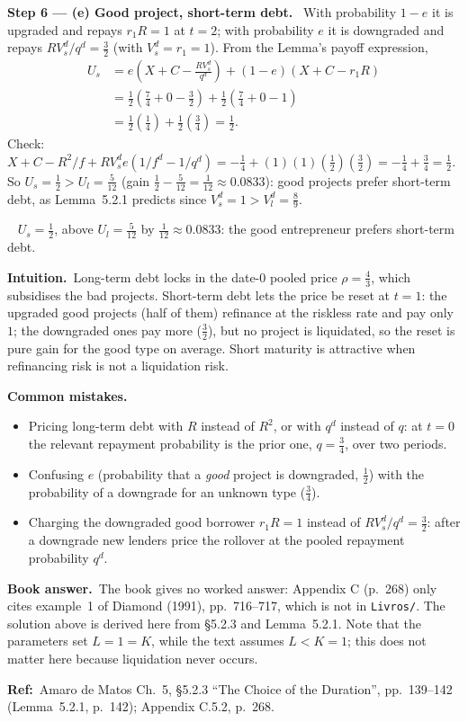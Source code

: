 \documentclass[11pt,a4paper]{article}
\newcommand{\step}[2]{\par\medskip\noindent\textbf{Step #1 --- #2.}~}
\newcommand{\intuition}{\par\medskip\noindent\textbf{Intuition.}~}
\newcommand{\bookans}{\par\medskip\noindent\textbf{Book answer.}~}
\newcommand{\refbib}{\par\smallskip\noindent\textbf{Ref:}~}
\newcommand{\answer}[1]{\par\smallskip\noindent\fbox{\textbf{Answer #1.}}~}
\newcommand{\pitfalls}{\par\medskip\noindent\textbf{Common mistakes.}}
\begin{document}
\step{6}{(e) Good project, short-term debt} With probability $1-e$ it is upgraded and repays $r_1R=1$
at $t=2$; with probability $e$ it is downgraded and repays $RV_s^d/q^d=\tfrac32$ (with $V_s^d=r_1=1$).
From the Lemma's payoff expression,
\begin{align}
  U_s &= e\left(X+C-\frac{RV_s^d}{q^d}\right)+(1-e)(X+C-r_1R) \label{t5e5-Us}\\
      &= \tfrac12\left(\tfrac74+0-\tfrac32\right)+\tfrac12\left(\tfrac74+0-1\right) \nonumber\\
      &= \tfrac12\left(\tfrac14\right)+\tfrac12\left(\tfrac34\right) = \tfrac12. \nonumber
\end{align}
Check: $X+C-R^2/f+RV_s^de(1/f^d-1/q^d)=-\tfrac14+(1)(1)\left(\tfrac12\right)\left(\tfrac32\right)=-\tfrac14+\tfrac34=\tfrac12$.
So $U_s=\tfrac12>U_l=\tfrac{5}{12}$ (gain $\tfrac12-\tfrac5{12}=\tfrac1{12}\approx0.0833$): good projects prefer
short-term debt, as Lemma~5.2.1 predicts since $V_s^d=1>V_l^d=\tfrac89$.

\answer{(e)} $U_s=\tfrac12$, above $U_l=\tfrac5{12}$ by $\tfrac1{12}\approx0.0833$: the good entrepreneur
prefers short-term debt.

\intuition Long-term debt locks in the date-0 pooled price $\rho=\tfrac43$, which subsidises the
bad projects. Short-term debt lets the price be reset at $t=1$: the upgraded good projects (half
of them) refinance at the riskless rate and pay only $1$; the downgraded ones pay more ($\tfrac32$),
but no project is liquidated, so the reset is pure gain for the good type on average. Short maturity
is attractive when refinancing risk is not a liquidation risk.
\pitfalls
\begin{itemize}
  \item Pricing long-term debt with $R$ instead of $R^2$, or with $q^d$ instead of $q$: at $t=0$ the
        relevant repayment probability is the prior one, $q=\tfrac34$, over two periods.
  \item Confusing $e$ (probability that a \emph{good} project is downgraded, $\tfrac12$) with the
        probability of a downgrade for an unknown type ($\tfrac34$).
  \item Charging the downgraded good borrower $r_1R=1$ instead of $RV_s^d/q^d=\tfrac32$: after a downgrade
        new lenders price the rollover at the pooled repayment probability $q^d$.
\end{itemize}
\bookans The book gives no worked answer: Appendix C (p.~268) only cites example~1 of Diamond (1991),
pp.~716--717, which is not in \texttt{Livros/}. The solution above is derived here from \S 5.2.3 and
Lemma~5.2.1. Note that the parameters set $L=1=K$, while the text assumes $L<K=1$; this does not
matter here because liquidation never occurs.
\refbib{Amaro de Matos Ch.~5, \S 5.2.3 ``The Choice of the Duration'', pp.~139--142 (Lemma~5.2.1, p.~142); Appendix C.5.2, p.~268.}
\end{document}
